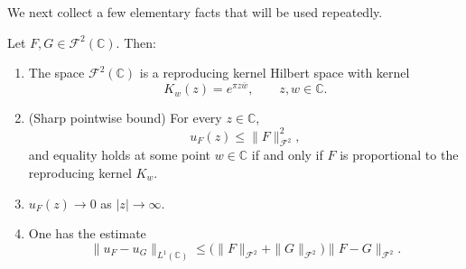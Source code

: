 \medskip

We next collect a few elementary facts that will be used repeatedly.

\begin{lemma}\label{lem:Fock-basic}
Let $F,G \in \mathcal{F}^2(\mathbb{C})$. Then:
\begin{enumerate}
\item[(i)] The space $\mathcal{F}^2(\mathbb{C})$ is a reproducing kernel Hilbert space with kernel
\[
K_w(z) = e^{\pi z \overline{w}}, \qquad z,w \in \mathbb{C}.
\]

\item[(ii)] (Sharp pointwise bound) For every $z \in \mathbb{C}$,
\[
u_F(z) \le \|F\|_{\mathcal{F}^2}^2,
\]
and equality holds at some point $w \in \mathbb{C}$ if and only if $F$ is
proportional to the reproducing kernel $K_w$.

\item[(iii)] $u_F(z) \to 0$ as $|z| \to \infty$.

\item[(iv)] One has the estimate
\[
\|u_F - u_G\|_{L^1(\mathbb{C})}
\le \big( \|F\|_{\mathcal{F}^2} + \|G\|_{\mathcal{F}^2} \big)
\|F - G\|_{\mathcal{F}^2}.
\]
\end{enumerate}
\end{lemma}

